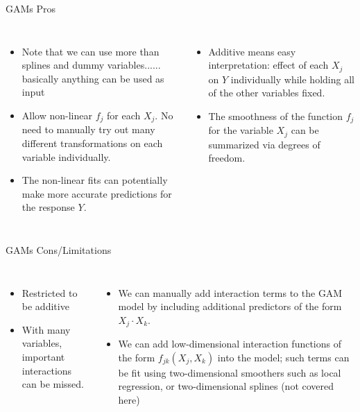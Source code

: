 \documentclass[aspectratio=169,usenames,dvipsnames]{beamer}
\newcommand{\InstructorList}[1]{
\begin{itemize}
	\color{orange}
	#1
\end{itemize}
}
\begin{document}
\begin{frame}[t]{GAMs Pros}

\begin{columns}
\centering
\InstructorList{
  \item Note that we can use more than splines and dummy variables...... basically anything can be used as input
	\item Allow non-linear $f_j$ for  each $X_j$.
	No need to manually try out many different transformations on each variable individually.
\item The non-linear fits can potentially make more accurate predictions for the response $Y$.

}

\centering

\InstructorList{
\item Additive means easy interpretation: effect of each $X_j$
on $Y$ individually while holding all of the other variables fixed.
\item The smoothness of the function $f_j$ for the variable $X_j$ can be summarized via degrees of freedom.
}


\end{columns}

\end{frame}
\begin{frame}[t]{GAMs Cons/Limitations}

\begin{columns}
\centering
\InstructorList{
  \item Restricted to be additive
	\item With many variables, important interactions can be missed.

}
\centering

\InstructorList{
\item We can manually add interaction terms to the GAM model by including additional predictors of the
form $X_j \cdot X_k$.
\item We can add low-dimensional interaction functions of the form $f_{jk} (X_j , X_k )$ into the model; such terms can be fit using two-dimensional smoothers such as local regression, or two-dimensional splines (not covered here)
}

\end{columns}

\end{frame}
\end{document}
